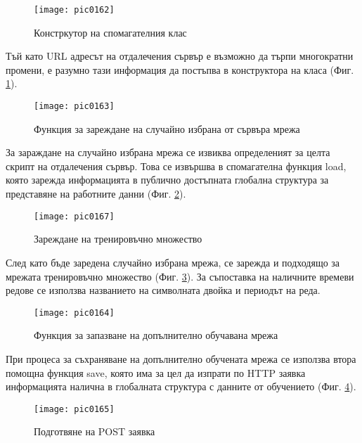 \begin{figure}[h]
  \centering
  \texttt{[image: pic0162]}
  \caption{Констркутор на спомагателния клас}
\label{fig:pic0162}
\end{figure}
\FloatBarrier

Тъй като URL адресът на отдалечения сървър е възможно да търпи многократни промени, е разумно тази информация да постъпва в конструктора на класа (Фиг. \ref{fig:pic0162}).

\begin{figure}[h]
  \centering
  \texttt{[image: pic0163]}
  \caption{Функция за зареждане на случайно избрана от сървъра мрежа}
\label{fig:pic0163}
\end{figure}
\FloatBarrier

За зараждане на случайно избрана мрежа се извиква определеният за целта скрипт на отдалечения сървър. Това се извършва в спомагателна функция load, която зарежда информацията в публично достъпната глобална структура за представяне на работните данни (Фиг. \ref{fig:pic0163}). 

\begin{figure}[h]
  \centering
  \texttt{[image: pic0167]}
  \caption{Зареждане на тренировъчно множество}
\label{fig:pic0167}
\end{figure}
\FloatBarrier

След като бъде заредена случайно избрана мрежа, се зарежда и подходящо за мрежата тренировъчно множество  (Фиг. \ref{fig:pic0167}). За съпоставка на наличните времеви редове се използва названието на символната двойка и периодът на реда. 

\begin{figure}[h]
  \centering
  \texttt{[image: pic0164]}
  \caption{Функция за запазване на допълнително обучавана мрежа}
\label{fig:pic0164}
\end{figure}
\FloatBarrier

При процеса за съхраняване на допълнително обучената мрежа се използва втора помощна функция save, която има за цел да изпрати по HTTP заявка информацията налична в глобалната структура с данните от обучението (Фиг. \ref{fig:pic0164}). 

\begin{figure}[h]
  \centering
  \texttt{[image: pic0165]}
  \caption{Подготвяне на POST заявка}
\label{fig:pic0165}
\end{figure}
\FloatBarrier

